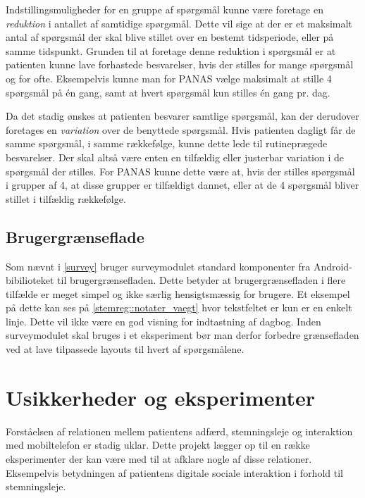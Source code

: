 Indstillingsmuligheder for en gruppe af spørgsmål kunne være foretage en \emph{reduktion} i antallet af samtidige spørgsmål.
Dette vil sige at der er et maksimalt antal af spørgsmål der skal blive stillet over en bestemt tidsperiode, eller på samme tidspunkt.
Grunden til at foretage denne reduktion i spørgsmål er at patienten kunne lave forhastede besvarelser, hvis der stilles for mange spørgsmål og for ofte.
Eksempelvis kunne man for PANAS vælge maksimalt at stille 4 spørgsmål på én gang, samt at hvert spørgsmål kun stilles én gang pr. dag.

Da det stadig ønskes at patienten besvarer samtlige spørgsmål, kan der derudover foretages en \emph{variation} over de benyttede spørgsmål.
Hvis patienten dagligt får de samme spørgsmål, i samme rækkefølge, kunne dette lede til rutineprægede besvarelser.
Der skal altså være enten en tilfældig eller justerbar variation i de spørgsmål der stilles.
For PANAS kunne dette være at, hvis der stilles spørgsmål i grupper af 4, at disse grupper er tilfældigt dannet, eller at de 4 spørgsmål bliver stillet i tilfældig rækkefølge.

\subsection{Brugergrænseflade}
Som nævnt i \cref{survey} bruger surveymodulet standard komponenter fra Android-bibilioteket til brugergrænsefladen.
Dette betyder at brugergrænsefladen i flere tilfælde er meget simpel og ikke særlig hensigtsmæssig for brugere.
Et eksempel på dette kan ses på \cref{stemreg::notater_vaegt} hvor tekstfeltet er kun er en enkelt linje.
Dette vil ikke være en god visning for indtastning af dagbog.
Inden surveymodulet skal bruges i et eksperiment bør man derfor forbedre grænsefladen ved at lave tilpassede layouts til hvert af spørgsmålene.


\section{Usikkerheder og eksperimenter}\label{refleksion:usikkerhed}
Forståelsen af relationen mellem patientens adfærd, stemningsleje og interaktion med mobiltelefon er stadig uklar.
Dette projekt lægger op til en række eksperimenter der kan være med til at afklare nogle af disse relationer.
Eksempelvis betydningen af patientens digitale sociale interaktion i forhold til stemningsleje.

